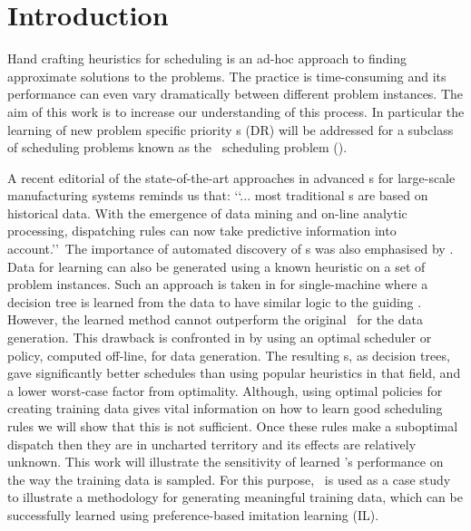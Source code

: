 \documentclass[twocolumn]{svjour3}
\begin{document}

\section{Introduction}\label{sec:introduction}

Hand crafting heuristics for scheduling is an ad-hoc approach to finding 
approximate solutions to the problems. The practice is time-consuming and its 
performance can even vary dramatically between different problem instances. The 
aim of this work is to increase our understanding of this process. In 
particular the learning of new problem specific priority \dr s (DR) will be 
addressed for a subclass of scheduling problems known as the \jsp\ scheduling 
problem (\JSP). 

A recent editorial of the state-of-the-art approaches \cite{Chen13} in advanced 
\dr s for large-scale manufacturing systems reminds us that:
\lq\lq ... most traditional \dr s are based on historical data. 
With the emergence of data mining and on-line analytic processing, dispatching 
rules can now take predictive information into account.\rq\rq~The importance of 
automated discovery of \dr s was also emphasised by \cite{Monch13}. 
Data for learning can also be generated using a known heuristic on a set of 
problem instances.
Such an approach is taken in \cite{Siggi05} for single-machine where
a decision tree is learned from the data to have similar logic to the guiding 
\dr. 
However, the learned method cannot outperform the original \dr\ for the data 
generation. 
This drawback is confronted in \cite{Malik08,Russell09,Siggi10} by using an 
optimal scheduler or policy, computed off-line, for data generation. The 
resulting \dr s, as decision trees, gave significantly better schedules than 
using popular heuristics in that field, and a lower worst-case factor from 
optimality. 
Although, using optimal policies for creating training data gives vital 
information on how to learn good scheduling rules we will show that this is 
not sufficient. Once these rules make a suboptimal dispatch then they are in 
uncharted territory and its effects are relatively unknown. 
This work will illustrate the sensitivity of learned \dr's performance on the 
way the training data is sampled.
For this purpose, \JSP\ is used as a case study to illustrate a methodology for 
generating meaningful training data, which can be successfully 
learned using preference-based imitation learning (IL).
\end{document}
